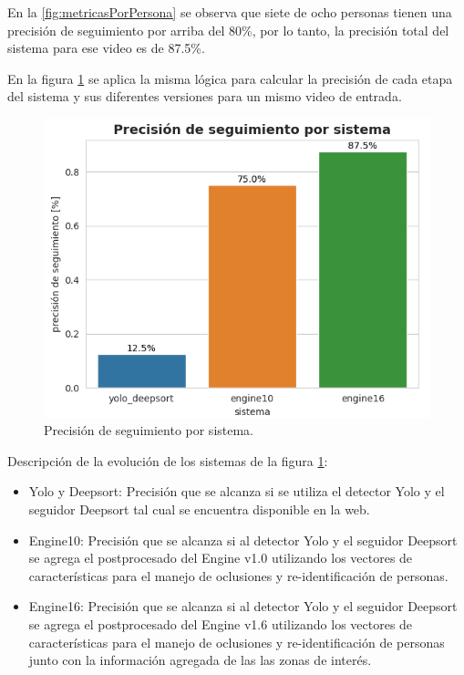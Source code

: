 En la \ref{fig:metricasPorPersona} se observa que siete de ocho personas tienen una precisión de seguimiento por arriba del 80\%, por lo tanto, la precisión total del sistema para ese video es de 87.5\%. 

En la figura \ref{fig:metricasPorSistema} se aplica la misma lógica para calcular la precisión de cada etapa del sistema y sus diferentes versiones para un mismo video de entrada.

\newpage

\begin{figure}[ht]
	\centering
	\includegraphics[scale=.80]{./Figures/metricasPorSistema.png}
	\caption{Precisión de seguimiento por sistema.}
	\label{fig:metricasPorSistema}
\end{figure}

Descripción de la evolución de los sistemas de la figura \ref{fig:metricasPorSistema}:
\begin{itemize}
\item Yolo y Deepsort: Precisión que se alcanza si se utiliza el detector Yolo y el seguidor Deepsort tal cual se encuentra disponible en la web.
\item Engine10: Precisión que se alcanza si al detector Yolo y el seguidor Deepsort se agrega el postprocesado del Engine v1.0 utilizando los vectores de características para el manejo de oclusiones y re-identificación de personas.
\item Engine16: Precisión que se alcanza si al detector Yolo y el seguidor Deepsort se agrega el postprocesado del Engine v1.6 utilizando los vectores de características para el manejo de oclusiones y re-identificación de personas junto con la información agregada de las las zonas de interés.
\end{itemize}

